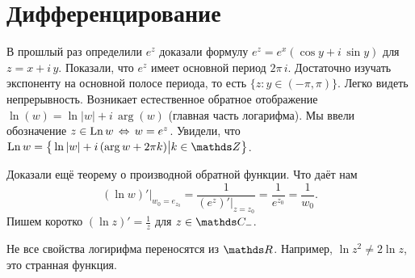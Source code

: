 \section{Дифференцирование}
В прошлый раз определили $e^z$  доказали формулу $e^z = e^x(\cos y + i\,\sin y)$ для $z = x+ i\,y$. Показали, что $e^z$ имеет основной период $2\pi\,i$. Достаточно изучать экспоненту на основной полосе периода, то есть $\big\{z\colon y\in(-\pi,\pi)\big\}$. Легко видеть непрерывность. Возникает естественное обратное отображение $\ln (w) = \ln|w| + i\,\arg(w)$ (главная часть логарифма). Мы ввели обозначение $z\in\operatorname{Ln} w\,\Leftrightarrow\, w = e^z$. Увидели, что $\Ln w = \big\{\ln|w| + i\,(\arg w + 2\pi k)\big|k\in\Z\big\}$.

Доказали ещё теорему о производной обратной функции. Что даёт нам
\[
	(\ln w)'\big|_{w_0=e_{z_0}} = \frac1{(e^z)'\big|_{z=z_0}}=\frac1{e^{z_0}} = \frac1{w_0}.
\]
Пишем коротко $(\ln z)' = \frac1z$ для $z\in\C_-$.

Не все свойства логирифма переносятся из $\R$. Например, $\ln z^2\ne 2\ln z$, это странная функция.

